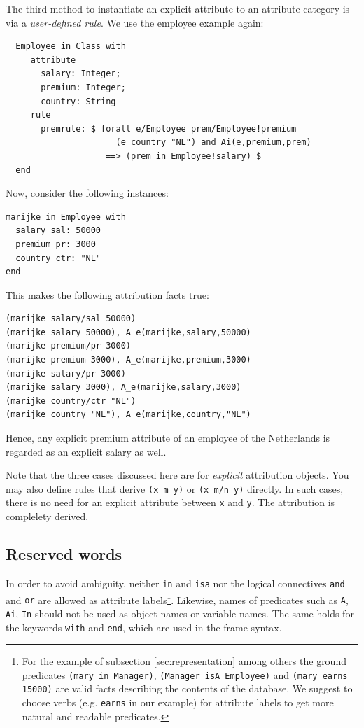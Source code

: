 The third method to instantiate an explicit attribute to an attribute category is via 
a {\em user-defined rule}.
We use the employee example again:

\begin{verbatim}
  Employee in Class with
     attribute
       salary: Integer;
       premium: Integer;
       country: String
     rule
       premrule: $ forall e/Employee prem/Employee!premium 
                      (e country "NL") and Ai(e,premium,prem)
                    ==> (prem in Employee!salary) $
  end  
\end{verbatim}

Now, consider the following instances:

\begin{verbatim}
marijke in Employee with
  salary sal: 50000
  premium pr: 3000
  country ctr: "NL"
end
\end{verbatim}

This makes the following attribution facts true:

\begin{verbatim}
(marijke salary/sal 50000)
(marijke salary 50000), A_e(marijke,salary,50000)
(marijke premium/pr 3000)
(marijke premium 3000), A_e(marijke,premium,3000)
(marijke salary/pr 3000)
(marijke salary 3000), A_e(marijke,salary,3000)
(marijke country/ctr "NL")
(marijke country "NL"), A_e(marijke,country,"NL")
\end{verbatim}

Hence, any explicit premium attribute of an employee of the Netherlands is regarded as an
explicit salary as well.

Note that the three cases discussed here are for {\em explicit\/} attribution objects. You may also
define rules that derive {\tt (x m y)} or {\tt (x m/n y)} directly. In such cases, there is no need
for an explicit attribute between {\tt x}  and {\tt y}. The attribution is complelety derived.


\subsection{Reserved words}

In order to avoid ambiguity, neither {\tt in} and {\tt isa} nor the
logical connectives {\tt and} and {\tt or} are allowed as attribute
labels\footnote{For the example of subsection \ref{sec:representation} among others the
  ground predicates {\tt (mary in Manager)}, {\tt (Manager isA
    Employee)} and {\tt (mary earns 15000)} are valid facts describing
  the contents of the database. We suggest to choose verbs (e.g. {\tt earns}
  in our example) for attribute labels to get more natural and
  readable predicates.}.
Likewise, names of predicates such as {\tt A}, {\tt Ai}, {\tt In} should not be used as object names
or variable names. The same holds for the keywords {\tt with} and {\tt end}, which are used in the
frame syntax.


